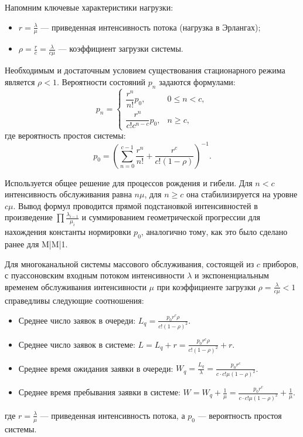 Напомним ключевые характеристики нагрузки: 
\begin{itemize}
    \item $r = \frac{\lambda}{\mu}$ — приведенная интенсивность потока (нагрузка в Эрлангах);
    \item $\rho = \frac{r}{c} = \frac{\lambda}{c\mu}$ — коэффициент загрузки системы.
\end{itemize}

\begin{statement}
Необходимым и достаточным условием существования стационарного режима является $\rho < 1$. Вероятности состояний $p_n$ задаются формулами:
$$
p_n = 
\begin{cases} 
    \dfrac{r^n}{n!} p_0, & 0 \le n < c, \\[3mm]
    \dfrac{r^n}{c! c^{n-c}} p_0, & n \ge c,
\end{cases}
$$
где вероятность простоя системы:
$$
p_0 = \left( \sum_{n=0}^{c-1} \frac{r^n}{n!} + \frac{r^c}{c!(1 - \rho)} \right)^{-1}.
$$
\end{statement}

\begin{sproof}
Используется общее решение для процессов рождения и гибели. Для $n < c$ интенсивность обслуживания равна $n\mu$, для $n \ge c$ она стабилизируется на уровне $c\mu$. Вывод формул проводится прямой подстановкой интенсивностей в произведение $\prod \frac{\lambda_{i-1}}{\mu_i}$ и суммированием геометрической прогрессии для нахождения константы нормировки $p_0$, аналогично тому, как это было сделано ранее для M|M|1.
\end{sproof}

\begin{statement}
Для многоканальной системы массового обслуживания, состоящей из $c$ приборов, с пуассоновским входным потоком интенсивности $\lambda$ и экспоненциальным временем обслуживания интенсивности $\mu$ при коэффициенте загрузки $\rho = \frac{\lambda}{c\mu} < 1$ справедливы следующие соотношения:
\begin{itemize}
    \item Среднее число заявок в очереди: $\displaystyle L_q = \frac{p_0 r^c \rho}{c! (1-\rho)^2}$.
    \item Среднее число заявок в системе: $\displaystyle L  = L_q + r = \frac{p_0 r^c \rho}{c! (1-\rho)^2} + r$.
    \item Среднее время ожидания заявки в очереди: $\displaystyle W_q = \frac{L_q}{\lambda} = \frac{p_0 r^c}{c \cdot c! \mu (1-\rho)^2}$.
    \item Среднее время пребывания заявки в системе: $\displaystyle W = W_q + \frac{1}{\mu} = \frac{p_0 r^c}{c \cdot c! \mu (1-\rho)^2} + \frac{1}{\mu}$.
\end{itemize}
где $r = \frac{\lambda}{\mu}$ — приведенная интенсивность потока, а $p_0$ — вероятность простоя системы.
\end{statement}

